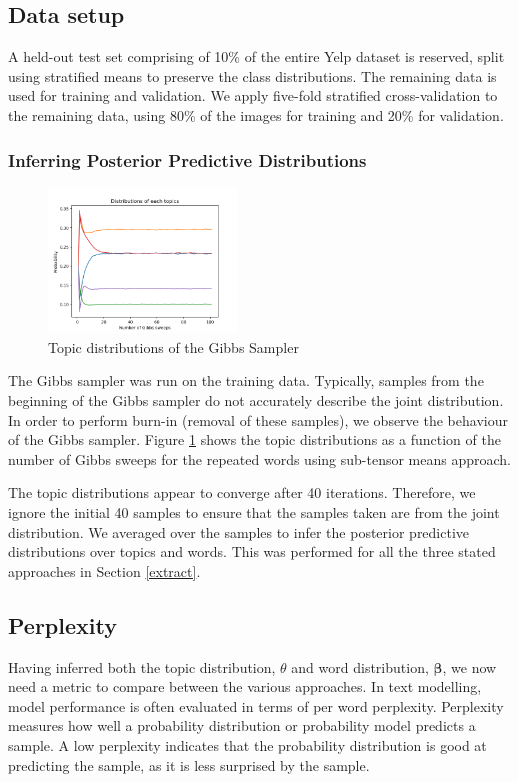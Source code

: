 \documentclass{article}
\begin{document}
\subsection{Data setup}
A held-out test set comprising of 10\% of the entire Yelp dataset is reserved, split using stratified means to preserve the class distributions. The remaining data is used for training and validation. We apply five-fold stratified cross-validation to the remaining data, using 80\% of the images for training and 20\% for validation. 

\subsubsection{Inferring Posterior Predictive Distributions}

\begin{figure}
  \includegraphics[width=5cm]{convergence.png}
  \caption{Topic distributions of the Gibbs Sampler}
  \label{convergence}
\end{figure}

The Gibbs sampler was run on the training data. Typically, samples from the beginning of the Gibbs sampler do not accurately describe the joint distribution. In order to perform burn-in (removal of these samples), we observe the behaviour of the Gibbs sampler. Figure \ref{convergence} shows the topic distributions as a function of the number of Gibbs sweeps for the repeated words using sub-tensor means approach. 

The topic distributions appear to converge after 40 iterations. Therefore, we ignore the initial 40 samples to ensure that the samples taken are from the joint distribution. We averaged over the samples to infer the posterior predictive distributions over topics and words. This was performed for all the three stated approaches in Section \ref{extract}.

\subsection{Perplexity}
Having inferred both the topic distribution, $\theta$ and word distribution, $\bm{\beta}$, we now need a metric to compare between the various approaches. In text modelling, model performance is often evaluated in terms of per word perplexity. Perplexity measures how well a probability distribution or probability model predicts a sample. A low perplexity indicates that the probability distribution is good at predicting the sample, as it is less surprised by the sample.  
\end{document}
